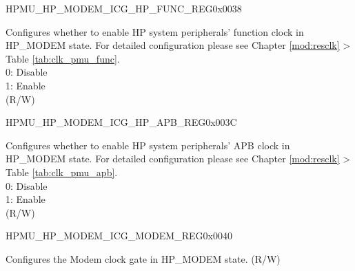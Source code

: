 \begin{register}{H}{PMU\_HP\_MODEM\_ICG\_HP\_FUNC\_REG}{0x0038}\label{regdesc:PMUHPMODEMICGHPFUNCREG}
%
\regnewline%
\begin{regdesc}\begin{reglist}
\label{fielddesc:PMUHPMODEMDIGICGFUNCEN}\item [PMU\_HP\_MODEM\_DIG\_ICG\_FUNC\_EN] Configures whether to enable HP system peripherals' function clock in HP\_MODEM state. For detailed configuration please see Chapter \ref{mod:resclk} \textit{} > Table \ref{tab:clk_pmu_func}.\\
0: Disable\\
1: Enable\\
(R/W)
\end{reglist}\end{regdesc}
\end{register}


\begin{register}{H}{PMU\_HP\_MODEM\_ICG\_HP\_APB\_REG}{0x003C}\label{regdesc:PMUHPMODEMICGHPAPBREG}
%
\regnewline%
\begin{regdesc}\begin{reglist}
\label{fielddesc:PMUHPMODEMDIGICGAPBEN}\item [PMU\_HP\_MODEM\_DIG\_ICG\_APB\_EN] Configures whether to enable HP system peripherals' APB clock in HP\_MODEM state. For detailed configuration please see Chapter \ref{mod:resclk} \textit{} > Table \ref{tab:clk_pmu_apb}. \\
0: Disable\\
1: Enable\\
(R/W)
\end{reglist}\end{regdesc}
\end{register}


\begin{register}{H}{PMU\_HP\_MODEM\_ICG\_MODEM\_REG}{0x0040}\label{regdesc:PMUHPMODEMICGMODEMREG}
%
%
\regnewline%
\begin{regdesc}\begin{reglist}
\label{fielddesc:PMUHPMODEMDIGICGMODEMCODE}\item [PMU\_HP\_MODEM\_DIG\_ICG\_MODEM\_CODE] Configures the Modem clock gate in HP\_MODEM state. (R/W)
\end{reglist}\end{regdesc}
\end{register}


